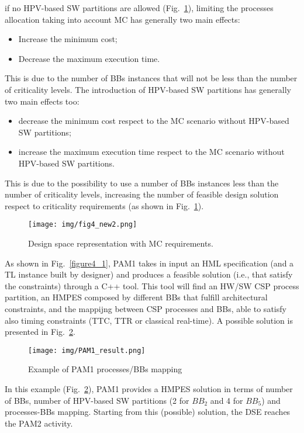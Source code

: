 if no HPV-based SW partitions are allowed (Fig.~\ref{fig4}), limiting the processes allocation taking into account MC has generally two main effects: 
%
\begin{itemize}
    \item Increase the minimum cost;
    \item Decrease the maximum execution time.
\end{itemize}
%
This is due to the number of BBs instances that will not be less than the number of criticality levels. The introduction of HPV-based SW partitions has generally two main effects too: 
%
\begin{itemize}
    \item decrease the minimum cost respect to the MC scenario without HPV-based SW partitions;
    \item increase the maximum execution time respect to the MC scenario without HPV-based SW partitions.
\end{itemize}
%
This is due to the possibility to use a number of BBs instances less than the number of criticality levels, increasing the number of feasible design solution respect to criticality requirements (as shown in Fig.~\ref{fig4}).
%
\begin{figure}[htbp]
	\centerline{\texttt{[image: img/fig4\_new2.png]}}
	\caption{Design space representation with MC requirements.}
	\label{fig4}
\end{figure}
%
%
As shown in Fig.~\ref{figure4_1}, PAM1 takes in input an HML specification (and a TL instance built by designer) and produces a feasible solution (i.e., that satisfy the constraints) through a C++ tool. This tool will find an HW/SW CSP process partition, an HMPES composed by different BBs that fulfill architectural constraints, and the mappijng between CSP processes and BBs, able to satisfy also timing constraints (TTC, TTR or classical real-time). A possible solution is presented in Fig.~\ref{figure4_2}.  \par
%
\begin{figure}[!ht]
\centerline{\texttt{[image: img/PAM1\_result.png]}}
\caption{Example of PAM1 processes/BBs mapping\label{figure4_2}}
\end{figure}
%
In this example (Fig.~\ref{figure4_2}), PAM1 provides a HMPES solution in terms of number of BBs, number of HPV-based SW partitions (2 for $BB_2$ and 4 for $BB_5$) and processes-BBs mapping. Starting from this (possible) solution, the DSE reaches the PAM2 activity. 
%
